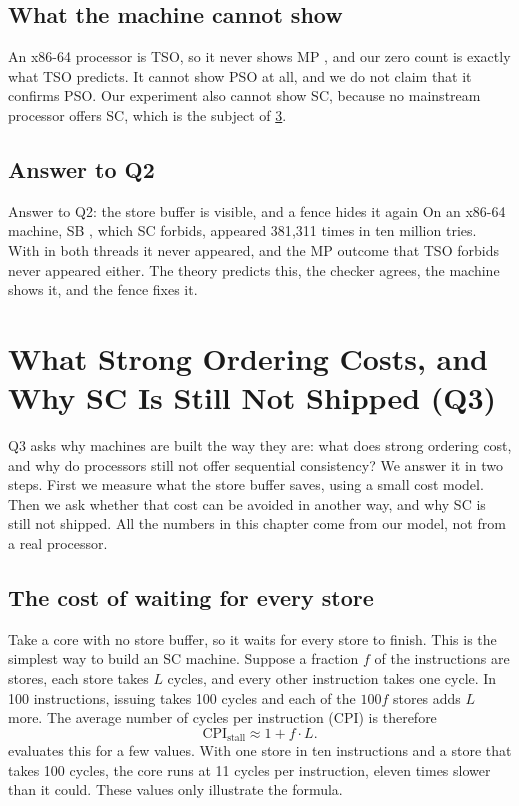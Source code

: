 \section{What the machine cannot show}

An x86-64 processor is TSO, so it never shows MP , and our zero count is exactly what TSO predicts. It cannot show PSO at all, and we do not claim that it confirms PSO. Our experiment also cannot show SC, because no mainstream processor offers SC, which is the subject of \cref{ch:cost}.

\section{Answer to Q2}
\label{sec:q2}

\begin{resultbox}{Answer to Q2: the store buffer is visible, and a fence hides it again}
On an x86-64 machine, SB , which SC forbids, appeared 381{,}311 times in ten million tries. With  in both threads it never appeared, and the MP outcome that TSO forbids never appeared either. The theory predicts this, the checker agrees, the machine shows it, and the fence fixes it.
\end{resultbox}

\chapter{What Strong Ordering Costs, and Why SC Is Still Not Shipped (Q3)}
\label{ch:cost}

Q3 asks why machines are built the way they are: what does strong ordering cost, and why do processors still not offer sequential consistency? We answer it in two steps. First we measure what the store buffer saves, using a small cost model. Then we ask whether that cost can be avoided in another way, and why SC is still not shipped. All the numbers in this chapter come from our model, not from a real processor.

\section{The cost of waiting for every store}
\label{sec:boe}

Take a core with no store buffer, so it waits for every store to finish. This is the simplest way to build an SC machine. Suppose a fraction $f$ of the instructions are stores, each store takes $L$ cycles, and every other instruction takes one cycle. In 100 instructions, issuing takes 100 cycles and each of the $100f$ stores adds $L$ more. The average number of cycles per instruction (CPI) is therefore
\[
\text{CPI}_{\text{stall}} \approx 1 + f \cdot L.
\]
 evaluates this for a few values. With one store in ten instructions and a store that takes 100 cycles, the core runs at 11 cycles per instruction, eleven times slower than it could. These values only illustrate the formula.

